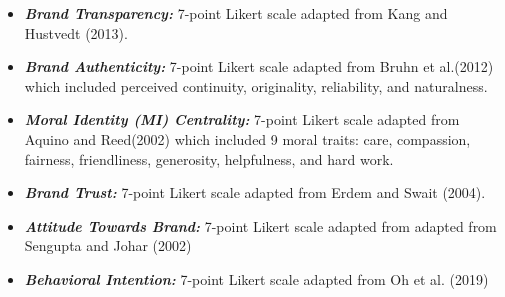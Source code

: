 \documentclass[a0,portrait]{a0poster}
\begin{document}
\begin{minipage}[c]{\linewidth}
\begin{framed}
\begin{multicols}{2}
\begin{itemize}
\begin{itemize} \item 
\textbf{\emph{Brand Transparency:}} 7-point Likert scale adapted from Kang and Hustvedt (2013).
\end{itemize}
\begin{itemize}
    \item \textbf{\emph{Brand Authenticity:}} 7-point Likert scale adapted from Bruhn et al.(2012) which included perceived continuity, originality, reliability, and naturalness.
\end{itemize}
\begin{itemize} \item
\textbf{\emph{Moral Identity (MI) Centrality:}} 7-point Likert scale adapted from Aquino and Reed(2002) which included 9 moral traits: care, compassion, fairness, friendliness, generosity, helpfulness, and hard work. 
\end{itemize}
\begin{itemize} \item
\textbf{\emph{Brand Trust:}} 7-point Likert scale adapted from
Erdem and Swait (2004).
\end{itemize}
\begin{itemize} \item
\textbf{\emph{Attitude Towards Brand:}} 7-point Likert scale adapted from adapted from Sengupta and Johar (2002)
\end{itemize}
\begin{itemize} \item
\textbf{\emph{Behavioral Intention:}} 7-point Likert scale adapted from Oh et al. (2019)
\end{itemize}
\end{itemize}

\color{Maroon}

\end{multicols}
\end{framed}
\end{minipage}
\end{document}
